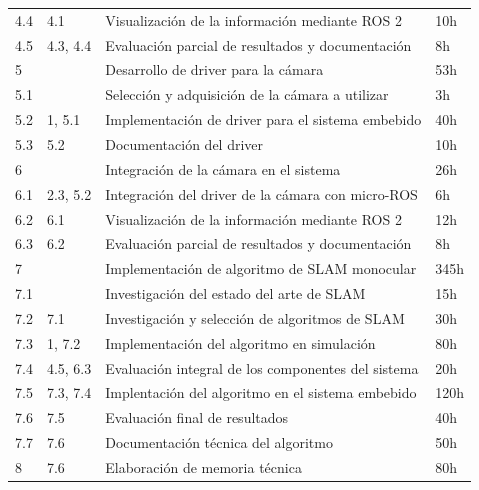 \documentclass[
11pt, %
codirector, %
]{charter}
\begin{document}
\begin{table}[]
\begin{tabular}{@{}llll@{}}
4.4             & 4.1                  & Visualización de la información mediante ROS 2     & 10h               \\
4.5             & 4.3, 4.4             & Evaluación parcial de resultados y documentación   & 8h                \\
5               &                      & Desarrollo de driver para la cámara                & 53h               \\
5.1             &                      & Selección y adquisición de la cámara a utilizar    & 3h                \\
5.2             & 1, 5.1               & Implementación de driver para el sistema embebido  & 40h               \\
5.3             & 5.2                  & Documentación del driver                           & 10h               \\
6               &                      & Integración de la cámara en el sistema             & 26h               \\
6.1             & 2.3, 5.2             & Integración del driver de la cámara con micro-ROS  & 6h                \\
6.2             & 6.1                  & Visualización de la información mediante ROS 2     & 12h               \\
6.3             & 6.2                  & Evaluación parcial de resultados y documentación   & 8h                \\
7               &                      & Implementación de algoritmo de SLAM monocular      & 345h              \\
7.1             &                      & Investigación del estado del arte de SLAM          & 15h               \\
7.2             & 7.1                  & Investigación y selección de algoritmos de SLAM    & 30h               \\
7.3             & 1, 7.2               & Implementación del algoritmo en simulación         & 80h               \\
7.4             & 4.5, 6.3        & Evaluación integral de los componentes del sistema & 20h               \\
7.5             & 7.3, 7.4                  & Implentación del algoritmo en el sistema embebido  & 120h              \\
7.6             & 7.5                  & Evaluación final de resultados                     & 40h               \\
7.7             & 7.6                  & Documentación técnica del algoritmo                & 50h               \\
8               & 7.6                  & Elaboración de memoria técnica                     & 80h               \\ \bottomrule
\end{tabular}
\end{table}
\end{document}
